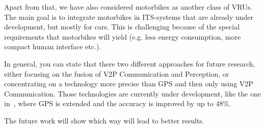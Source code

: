 \documentclass[]{ccs-thesis}
\begin{document}
Apart from that, we have also considered motorbikes as another class of \acp{VRU}. The main goal is to integrate motorbikes in \ac{ITS}-systems that are already under development, but mostly for cars. This is challenging because of the special requirements that motorbikes will yield (e.g. less energy consumption, more compact human interface etc.).

In general, you can state that there two different approaches for future research, either focusing on the fusion of V2P Communication and Perception, or concentrating on a technology more precise than GPS and then only using V2P Communication. Those technologies are currently under development, like the one in~\cite{doppler}, where GPS is extended and the accuracy is improved by up to 48\%. 

The future work will show which way will lead to better results.



\cleardoublepage

\listofabbreviations
\clearpage

\listoffigures
\clearpage

\printbibliography
\end{document}
